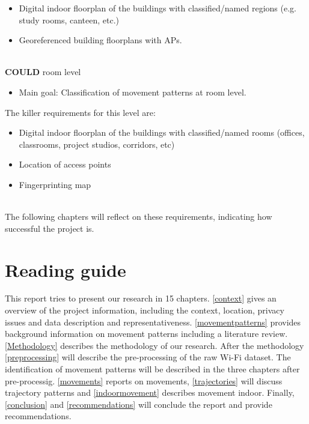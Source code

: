 \begin{itemize}
\item Digital indoor floorplan of the buildings with classified/named regions (e.g. study rooms, canteen, etc.)
\item Georeferenced building floorplans with APs.\\\\
\end{itemize}
\textbf{COULD} room level
\begin{itemize}
\item {\color{black!50}Main goal: Classification of movement patterns at room level.}
\end{itemize}
The killer requirements for this level are:
\begin{itemize}
\item {\color{black!50}Digital indoor floorplan of the buildings with classified/named rooms (offices, classrooms, project studios, corridors, etc)}
\item {\color{black!50}Location of access points}
\item {\color{black!50}Fingerprinting map}\\\\
\end{itemize}
The following chapters will reflect on these requirements, indicating how successful the project is.
\pagebreak

\section{Reading guide}
This report tries to present our research in 15 chapters. \autoref{context} gives an overview of the project information, including the context, location, privacy issues and data description and representativeness. \autoref{movementpatterns} provides background information on movement patterns including a literature review. \autoref{Methodology} describes the methodology of our research. After the methodology \autoref{preprocessing} will describe the pre-processing of the raw Wi-Fi dataset. The identification of movement patterns will be described in the three chapters after pre-processig. \autoref{movements} reports on movements, \autoref{trajectories} will discuss trajectory patterns and \autoref{indoormovement} describes movement indoor. Finally, \autoref{conclusion} and \autoref{recommendations} will conclude the report and provide recommendations.

